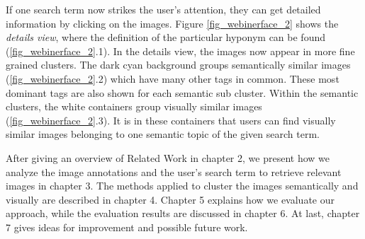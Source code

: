 If one search term now strikes the user's attention, they can get detailed information by clicking on the images. 
Figure \ref{fig_webinerface_2} shows the \emph{details view}, where the definition of the particular hyponym can be found (\ref{fig_webinerface_2}.1). 
In the details view, the images now appear in more fine grained clusters.
The dark cyan background groups semantically similar images (\ref{fig_webinerface_2}.2) which have many other tags in common. These most dominant tags are also shown for each semantic sub cluster.
Within the semantic clusters, the white containers group visually similar images (\ref{fig_webinerface_2}.3). It is in these containers that users can find visually similar images belonging to one semantic topic of the given search term.

\bigskip

After giving an overview of Related Work in chapter 2, we present how we analyze the image annotations and the user's search term to retrieve relevant images in chapter 3. The methods applied to cluster the images semantically and visually are described in chapter 4. Chapter 5 explains how we evaluate our approach, while the evaluation results are discussed in chapter 6. At last, chapter 7 gives ideas for improvement and possible future work.
